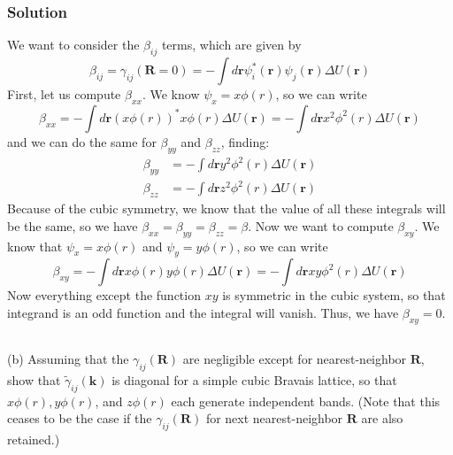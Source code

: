 \documentclass{article}
\begin{document}
\subsubsection{Solution}
We want to consider the $\beta_{i j}$ terms, which are given by
\begin{equation}
    \beta_{i j} = \gamma_{i j}(\mathbf{R}=0) = -\int d \mathbf{r} \psi_{i}^{*}(\mathbf{r}) \psi_{j}(\mathbf{r}) \Delta U(\mathbf{r})
\end{equation}
First, let us compute $\beta_{x x}$. We know $\psi_{x} = x\phi(r)$, so we can write
\begin{equation}
    \beta_{x x} = -\int d \mathbf{r} \left(x\phi(r)\right)^{*} x\phi(r) \Delta U(\mathbf{r}) = -\int d \mathbf{r} x^2\phi^2(r) \Delta U(\mathbf{r})
\end{equation}
and we can do the same for $\beta_{y y}$ and $\beta_{z z}$, finding:
\begin{align}
    \beta_{y y} &= -\int d \mathbf{r} y^2\phi^2(r) \Delta U(\mathbf{r})\\
    \beta_{z z} &= -\int d \mathbf{r} z^2\phi^2(r) \Delta U(\mathbf{r})
\end{align}
Because of the cubic symmetry, we know that the value of all these integrals will be the same, so we have $\beta_{x x} = \beta_{y y} = \beta_{z z} = \beta$. Now we want to compute $\beta_{x y}$. We know that $\psi_{x} = x\phi(r)$ and $\psi_{y} = y\phi(r)$, so we can write
\begin{equation}
    \beta_{x y} = -\int d \mathbf{r} x\phi(r) y\phi(r) \Delta U(\mathbf{r}) = -\int d \mathbf{r} xy\phi^2(r) \Delta U(\mathbf{r})
\end{equation}
Now everything except the function $xy$ is symmetric in the cubic system, so that integrand is an odd function and the integral will vanish. Thus, we have $\beta_{x y} = 0$.
\subsection{}
(b) Assuming that the $\gamma_{i j}(\mathbf{R})$ are negligible except for nearest-neighbor $\mathbf{R}$, show that $\tilde{\gamma}_{i j}(\mathbf{k})$ is diagonal for a simple cubic Bravais lattice, so that $x \phi(r), y \phi(r)$, and $z \phi(r)$ each generate independent bands. (Note that this ceases to be the case if the $\gamma_{i j}(\mathbf{R})$ for next nearest-neighbor $\mathbf{R}$ are also retained.)\\
\end{document}
